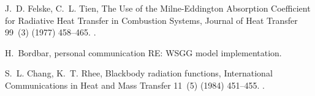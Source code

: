 \documentclass[preprint,12pt]{elsarticle}
\begin{document}
\begin{thebibliography}{10}
J.~D. Felske, C.~L. Tien, {The Use of the Milne-Eddington Absorption
Coefficient for Radiative Heat Transfer in Combustion Systems}, {Journal of
Heat Transfer} 99~(3) (1977) 458--465.
\newblock \href {http://dx.doi.org/10.1115/1.3450718}
  {}.

H.~Bordbar, {personal communication RE: WSGG model implementation}.

S.~L. Chang, K.~T. Rhee, {Blackbody radiation functions}, {International
Communications in Heat and Mass Transfer} 11~(5) (1984) 451--455.
\newblock \href {http://dx.doi.org/10.1016/0735-1933(84)90051-4}
  {}.

\end{thebibliography}

\end{document}
